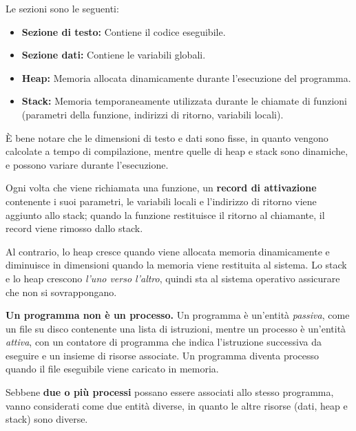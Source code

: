         Le sezioni sono le seguenti:
        \begin{itemize}
            \item \textbf{Sezione di testo:} Contiene il codice eseguibile.
            \item \textbf{Sezione dati:} Contiene le variabili globali.
            \item \textbf{Heap:} Memoria allocata dinamicamente durante l'esecuzione del programma.
            \item \textbf{Stack:} Memoria temporaneamente utilizzata durante le chiamate di funzioni (parametri della funzione, indirizzi di ritorno, variabili locali).
        \end{itemize}
        
        È bene notare che le dimensioni di testo e dati sono fisse, in quanto vengono calcolate a tempo di compilazione, mentre quelle di heap e stack sono dinamiche, e possono variare durante l'esecuzione.
        
        Ogni volta che viene richiamata una funzione, un \textbf{record di attivazione} contenente i suoi parametri, le variabili locali e l'indirizzo di ritorno viene aggiunto allo stack; quando la funzione restituisce il ritorno al chiamante, il record viene rimosso dallo stack.
        
        Al contrario, lo heap cresce quando viene allocata memoria dinamicamente e diminuisce in dimensioni quando la memoria viene restituita al sistema. Lo stack e lo heap crescono \textit{l'uno verso l'altro}, quindi sta al sistema operativo assicurare che non si sovrappongano.
        
        \textbf{Un programma non è un processo.} Un programma è un'entità \textit{passiva}, come un file su disco contenente una lista di istruzioni, mentre un processo è un'entità \textit{attiva}, con un contatore di programma che indica l'istruzione successiva da eseguire e un insieme di risorse associate. Un programma diventa processo quando il file eseguibile viene caricato in memoria.
        
        Sebbene \textbf{due o più processi} possano essere associati allo stesso programma, vanno considerati come due entità diverse, in quanto le altre risorse (dati, heap e stack) sono diverse.
        
